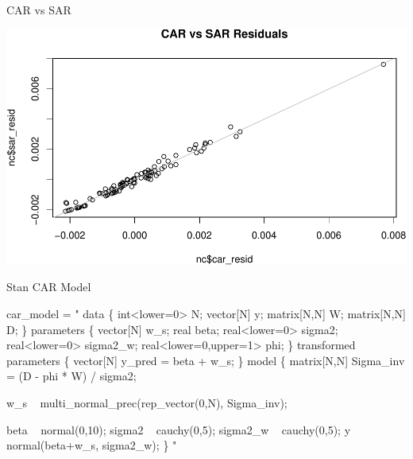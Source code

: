 \documentclass[11pt,ignorenonframetext,]{beamer}
\newenvironment{Shaded}{}{}
\newcommand{\NormalTok}[1]{#1}
\newcommand{\StringTok}[1]{\textcolor[rgb]{0.25,0.44,0.63}{#1}}
\let\oldShaded\Shaded
\let\endoldShaded\endShaded
\renewenvironment{Shaded}{\footnotesize\begin{spacing}{0.9}\oldShaded}{\endoldShaded\end{spacing}}
\let\oldverbatim\verbatim
\let\endoldverbatim\endverbatim
\newcommand{\scriptoutput}{
  \renewenvironment{Shaded}{\scriptsize\begin{spacing}{0.9}\oldShaded}{\endoldShaded\end{spacing}}
  \renewenvironment{verbatim}{\scriptsize\begin{spacing}{0.9}\oldverbatim}{\endoldverbatim\end{spacing}}
}
\begin{document}
\begin{frame}{CAR vs SAR}
\protect\hypertarget{car-vs-sar-1}{}

\begin{center}\includegraphics[width=\textwidth]{Lec18_files/figure-beamer/unnamed-chunk-18-1} \end{center}

\end{frame}

\begin{frame}[fragile,t]{Stan CAR Model}
\protect\hypertarget{stan-car-model}{}

\scriptoutput

\begin{Shaded}
\begin{Highlighting}[]
\NormalTok{car_model =}\StringTok{ "}
\StringTok{data \{}
\StringTok{  int<lower=0> N;}
\StringTok{  vector[N] y;}
\StringTok{  matrix[N,N] W;}
\StringTok{  matrix[N,N] D;}
\StringTok{\}}
\StringTok{parameters \{}
\StringTok{  vector[N] w_s;}
\StringTok{  real beta;}
\StringTok{  real<lower=0> sigma2;}
\StringTok{  real<lower=0> sigma2_w;}
\StringTok{  real<lower=0,upper=1> phi;}
\StringTok{\}}
\StringTok{transformed parameters \{}
\StringTok{  vector[N] y_pred = beta + w_s;}
\StringTok{\}}
\StringTok{model \{}
\StringTok{  matrix[N,N] Sigma_inv = (D - phi * W) / sigma2;  }

\StringTok{  w_s ~ multi_normal_prec(rep_vector(0,N), Sigma_inv);}

\StringTok{  beta ~ normal(0,10);}
\StringTok{  sigma2 ~ cauchy(0,5);}
\StringTok{  sigma2_w ~ cauchy(0,5);}
\StringTok{  }
\StringTok{  y ~ normal(beta+w_s, sigma2_w);}
\StringTok{\}}
\StringTok{"}
\end{Highlighting}
\end{Shaded}

\end{frame}
\end{document}
